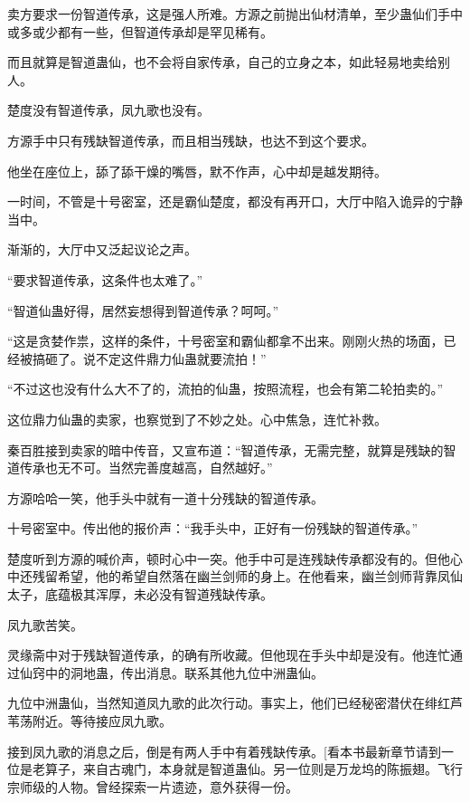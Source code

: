 
\begin{this_body}

卖方要求一份智道传承，这是强人所难。方源之前抛出仙材清单，至少蛊仙们手中或多或少都有一些，但智道传承却是罕见稀有。

而且就算是智道蛊仙，也不会将自家传承，自己的立身之本，如此轻易地卖给别人。

楚度没有智道传承，凤九歌也没有。

方源手中只有残缺智道传承，而且相当残缺，也达不到这个要求。

他坐在座位上，舔了舔干燥的嘴唇，默不作声，心中却是越发期待。

一时间，不管是十号密室，还是霸仙楚度，都没有再开口，大厅中陷入诡异的宁静当中。

渐渐的，大厅中又泛起议论之声。

“要求智道传承，这条件也太难了。”

“智道仙蛊好得，居然妄想得到智道传承？呵呵。”

“这是贪婪作祟，这样的条件，十号密室和霸仙都拿不出来。刚刚火热的场面，已经被搞砸了。说不定这件鼎力仙蛊就要流拍！”

“不过这也没有什么大不了的，流拍的仙蛊，按照流程，也会有第二轮拍卖的。”

这位鼎力仙蛊的卖家，也察觉到了不妙之处。心中焦急，连忙补救。

秦百胜接到卖家的暗中传音，又宣布道：“智道传承，无需完整，就算是残缺的智道传承也无不可。当然完善度越高，自然越好。”

方源哈哈一笑，他手头中就有一道十分残缺的智道传承。

十号密室中。传出他的报价声：“我手头中，正好有一份残缺的智道传承。”

楚度听到方源的喊价声，顿时心中一突。他手中可是连残缺传承都没有的。但他心中还残留希望，他的希望自然落在幽兰剑师的身上。在他看来，幽兰剑师背靠凤仙太子，底蕴极其浑厚，未必没有智道残缺传承。

凤九歌苦笑。

灵缘斋中对于残缺智道传承，的确有所收藏。但他现在手头中却是没有。他连忙通过仙窍中的洞地蛊，传出消息。联系其他九位中洲蛊仙。

九位中洲蛊仙，当然知道凤九歌的此次行动。事实上，他们已经秘密潜伏在绯红芦苇荡附近。等待接应凤九歌。

接到凤九歌的消息之后，倒是有两人手中有着残缺传承。[看本书最新章节请到一位是老算子，来自古魂门，本身就是智道蛊仙。另一位则是万龙坞的陈振翅。飞行宗师级的人物。曾经探索一片遗迹，意外获得一份。


\end{this_body}
